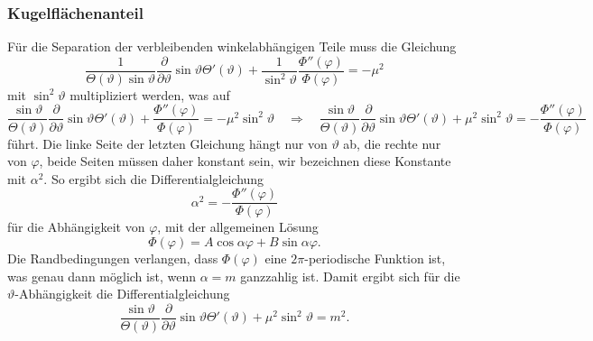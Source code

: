 \subsubsection{Kugelflächenanteil}
Für die Separation der verbleibenden winkelabhängigen Teile muss die
Gleichung
\[
\frac{1}{\Theta(\vartheta) \sin\vartheta}
\frac{\partial}{\partial\vartheta}\sin\vartheta\Theta'(\vartheta)
+
\frac{1}{\sin^2\vartheta}\frac{\Phi''(\varphi)}{\Phi(\varphi)}
=
-\mu^2
\]
mit $\sin^2\vartheta$ multipliziert werden, was auf
\[
\frac{\sin\vartheta}{\Theta(\vartheta)}
\frac{\partial}{\partial\vartheta}\sin\vartheta\Theta'(\vartheta)
+
\frac{\Phi''(\varphi)}{\Phi(\varphi)}
=
-\mu^2\sin^2\vartheta
\quad\Rightarrow\quad
\frac{\sin\vartheta}{\Theta(\vartheta)}
\frac{\partial}{\partial\vartheta}\sin\vartheta\Theta'(\vartheta)
+
\mu^2\sin^2\vartheta
=
-
\frac{\Phi''(\varphi)}{\Phi(\varphi)}
\]
führt.
Die linke Seite der letzten Gleichung hängt nur von $\vartheta$
ab, die rechte nur von $\varphi$, beide Seiten müssen daher
konstant sein, wir bezeichnen diese Konstante mit $\alpha^2$.
So ergibt sich die Differentialgleichung
\[
\alpha^2
=
-\frac{\Phi''(\varphi)}{\Phi(\varphi)}
\]
für die Abhängigkeit von $\varphi$, mit der allgemeinen Lösung
\[
\Phi(\varphi)
=
A\cos\alpha \varphi
+
B\sin\alpha \varphi.
\]
Die Randbedingungen verlangen, dass $\Phi(\varphi)$ eine $2\pi$-periodische
Funktion ist, was genau dann möglich ist, wenn $\alpha=m$ ganzzahlig ist.
Damit ergibt sich für die $\vartheta$-Abhängigkeit die Differentialgleichung
\begin{equation}
\frac{\sin\vartheta}{\Theta(\vartheta)}
\frac{\partial}{\partial\vartheta}\sin\vartheta\Theta'(\vartheta)
+
\mu^2\sin^2\vartheta
=
m^2.
\label{buch:pde:kugel:eqn:thetaanteil}
\end{equation}

